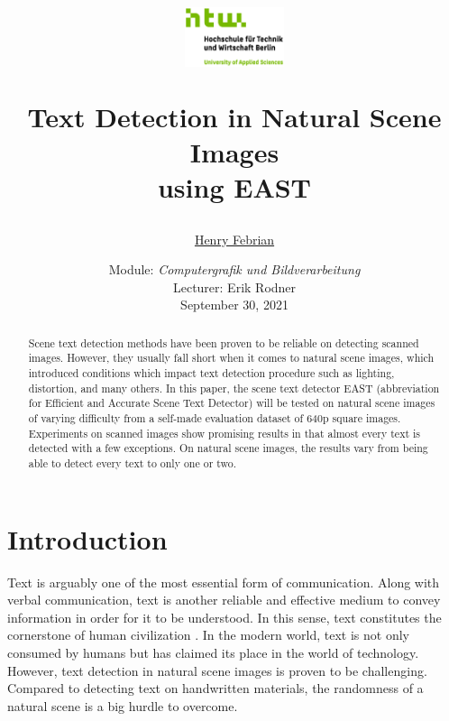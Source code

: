 \documentclass[10pt, a4paper]{article}
\begin{document}
	\title{
	\begin{figure}[!ht]
			\includegraphics[width=0.26\textwidth]{img/htwlogo.jpg}
	\end{figure}
	\vspace{1cm}
	\Huge Text Detection in Natural Scene Images \\
	using EAST
	}
	
	\vspace{1cm}
	
	\author{\Large \href{mailto:s0566146@htw-berlin.de}{Henry Febrian}
	\vspace{1cm}}
	
	\date{
	\large Module: \textit{Computergrafik und Bildverarbeitung} \\
	\vspace{0.8cm}
	\large Lecturer: Erik Rodner \\
	\vspace{1cm}
	\large September 30, 2021
	}

	\maketitle
	\setlength{\parindent}{0pt}

\vspace{2cm}
\begin{abstract}
Scene text detection methods have been proven to be reliable on detecting scanned images. However, they usually fall short when it comes to natural scene images, which introduced conditions which impact text detection procedure such as lighting, distortion, and many others.
In this paper, the scene text detector EAST (abbreviation for Efficient and Accurate Scene Text Detector) will be tested on natural scene images of varying difficulty from a self-made evaluation dataset of 640p square images.
Experiments on scanned images show promising results in that almost every text is detected with a few exceptions.
On natural scene images, the results vary from being able to detect every text to only one or two.
\end{abstract}
	\newpage
	\tableofcontents
	\newpage
	
\section{Introduction} %
\label{sec:introduction}
Text is arguably one of the most essential form of communication. Along with verbal communication, text is another reliable and effective medium to convey information in order for it to be understood. In this sense, text constitutes the cornerstone of human civilization \citep{LongEtAl}.
In the modern world, text is not only consumed by humans but has claimed its place in the world of technology.
However, text detection in natural scene images is proven to be challenging. Compared to detecting text on handwritten materials, the randomness of a natural scene is a big hurdle to overcome.
\end{document}
